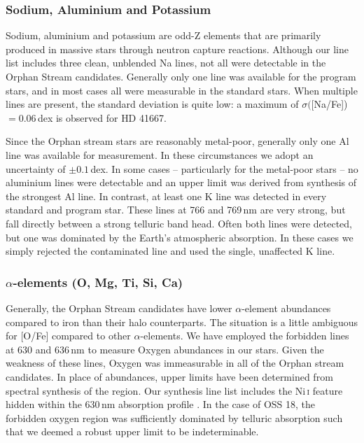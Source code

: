 \documentclass{emulateapj}
\begin{document}
\subsubsection{Sodium, Aluminium and Potassium}
Sodium, aluminium and potassium are odd-Z elements that are primarily produced in massive stars through neutron capture reactions. Although our line list includes three clean, unblended Na lines, not all were detectable in the Orphan Stream candidates. Generally only one line was available for the program stars, and in most cases all were measurable in the standard stars. When multiple lines are present, the standard deviation is quite low: a maximum of $\sigma($[Na/Fe])$ = 0.06$\,dex is observed for {HD 41667}.

Since the Orphan stream stars are reasonably metal-poor, generally only one Al line was available for measurement. In these circumstances we adopt an uncertainty of $\pm0.1$\,dex. In some cases -- particularly for the metal-poor stars -- no aluminium lines were detectable and an upper limit was derived from synthesis of the strongest Al line. In contrast, at least one K line was detected in every standard and program star. These lines at 766 and 769\,nm are very strong, but fall directly between a strong telluric band head. Often both lines were detected, but one was dominated by the Earth's atmospheric absorption. In these cases we simply rejected the contaminated line and used the single, unaffected K line.  


\subsubsection{$\alpha$-elements (O, Mg, Ti, Si, Ca)}

Generally, the Orphan Stream candidates have lower $\alpha$-element abundances compared to iron than their halo counterparts. The situation is a little ambiguous for [O/Fe] compared to other $\alpha$-elements. We have employed the forbidden lines at 630 and 636\,nm to measure Oxygen abundances in our stars. Given the weakness of these lines, Oxygen was immeasurable in all of the Orphan stream candidates. In place of abundances, upper limits have been determined from spectral synthesis of the region. Our synthesis line list includes the Ni\,\textsc{i} feature hidden within the 630\,nm absorption profile \citep{allende-prieto;et-al_2001}. In the case of OSS 18, the forbidden oxygen region was sufficiently dominated by telluric absorption such that we deemed a robust upper limit to be indeterminable.
\end{document}
